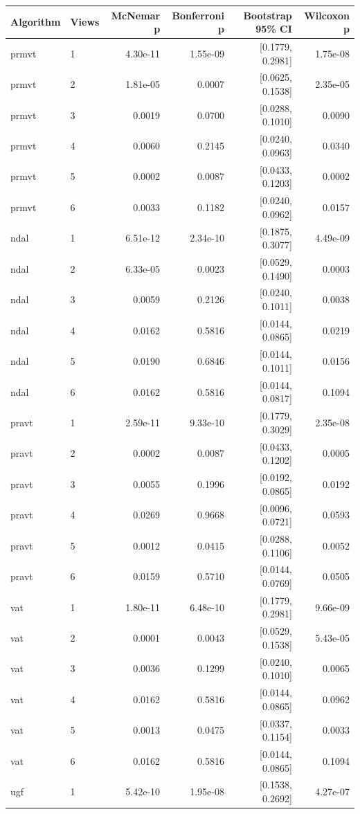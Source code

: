 \begin{tabular}{llrrrr}
\hline
Algorithm & Views & McNemar p & Bonferroni p & Bootstrap 95\% CI & Wilcoxon p \\
\hline
prmvt & 1 & 4.30e-11 & 1.55e-09 & [0.1779, 0.2981] & 1.75e-08 \\
prmvt & 2 & 1.81e-05 & 0.0007 & [0.0625, 0.1538] & 2.35e-05 \\
prmvt & 3 & 0.0019 & 0.0700 & [0.0288, 0.1010] & 0.0090 \\
prmvt & 4 & 0.0060 & 0.2145 & [0.0240, 0.0963] & 0.0340 \\
prmvt & 5 & 0.0002 & 0.0087 & [0.0433, 0.1203] & 0.0002 \\
prmvt & 6 & 0.0033 & 0.1182 & [0.0240, 0.0962] & 0.0157 \\
ndal & 1 & 6.51e-12 & 2.34e-10 & [0.1875, 0.3077] & 4.49e-09 \\
ndal & 2 & 6.33e-05 & 0.0023 & [0.0529, 0.1490] & 0.0003 \\
ndal & 3 & 0.0059 & 0.2126 & [0.0240, 0.1011] & 0.0038 \\
ndal & 4 & 0.0162 & 0.5816 & [0.0144, 0.0865] & 0.0219 \\
ndal & 5 & 0.0190 & 0.6846 & [0.0144, 0.1011] & 0.0156 \\
ndal & 6 & 0.0162 & 0.5816 & [0.0144, 0.0817] & 0.1094 \\
pravt & 1 & 2.59e-11 & 9.33e-10 & [0.1779, 0.3029] & 2.35e-08 \\
pravt & 2 & 0.0002 & 0.0087 & [0.0433, 0.1202] & 0.0005 \\
pravt & 3 & 0.0055 & 0.1996 & [0.0192, 0.0865] & 0.0192 \\
pravt & 4 & 0.0269 & 0.9668 & [0.0096, 0.0721] & 0.0593 \\
pravt & 5 & 0.0012 & 0.0415 & [0.0288, 0.1106] & 0.0052 \\
pravt & 6 & 0.0159 & 0.5710 & [0.0144, 0.0769] & 0.0505 \\
vat & 1 & 1.80e-11 & 6.48e-10 & [0.1779, 0.2981] & 9.66e-09 \\
vat & 2 & 0.0001 & 0.0043 & [0.0529, 0.1538] & 5.43e-05 \\
vat & 3 & 0.0036 & 0.1299 & [0.0240, 0.1010] & 0.0065 \\
vat & 4 & 0.0162 & 0.5816 & [0.0144, 0.0865] & 0.0962 \\
vat & 5 & 0.0013 & 0.0475 & [0.0337, 0.1154] & 0.0033 \\
vat & 6 & 0.0162 & 0.5816 & [0.0144, 0.0865] & 0.1094 \\
ugf & 1 & 5.42e-10 & 1.95e-08 & [0.1538, 0.2692] & 4.27e-07 \\

\end{tabular}
